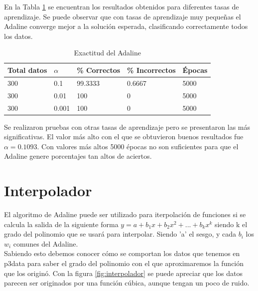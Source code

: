 \documentclass[a4paper]{article}
\begin{document}
		En la Tabla \ref{tabla:accAdaline} se encuentran los resultados obtenidos para diferentes tasas de aprendizaje.
		Se puede observar que con tasas de aprendizaje muy pequeñas el Adaline converge mejor a la solución esperada, clasificando correctamente todos los datos.
		\begin{table}[H]
		\begin{center}
		\begin{tabular}{|l|l|l|l|l|}
		\hline
		Total datos & $\alpha$ & \% Correctos & \% Incorrectos & Épocas\\
		\hline \hline
		300 & 0.1 & 99.3333 & 0.6667 & 5000\\ \hline
		300 & 0.01 & 100 & 0 & 5000\\ \hline
		300 & 0.001 & 100 & 0 & 5000\\ \hline
		\end{tabular}
		\caption{Exactitud del Adaline}
		\label{tabla:accAdaline}
		\end{center}
		\end{table}
		
		Se realizaron pruebas con otras tasas de aprendizaje pero se presentaron las más significativas. El valor más alto con el que se obtuvieron buenos resultados fue $\alpha=0.1093$. Con valores más altos 5000 épocas no son suficientes para que el Adaline genere porcentajes tan altos de aciertos.
	
\section{Interpolador}
	El algoritmo de Adaline puede ser utilizado para iterpolación de funciones si se calcula la salida de la siguiente forma $y = a + b_{1}x + b_{2}x^{2} + ... + b_{k}x^{k}$ siendo k el grado del polinomio que se usará para interpolar. Siendo 'a' el sesgo, y cada $b_{i}$ los $w_{i}$ comunes del Adaline.\\
	
	Sabiendo esto debemos conocer cómo se comportan los datos que tenemos en p3data para saber el grado del polinomio con el que aproximaremos la función que los originó. Con la figura \ref{fig:interpolador} se puede apreciar que los datos parecen ser originados por una función cúbica, aunque tengan un poco de ruido.
	
\end{document}
